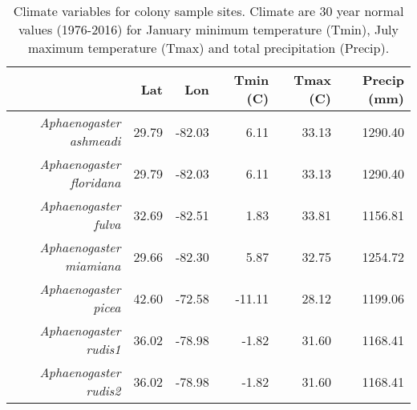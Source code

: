 \begin{table}[ht]
\centering
\begin{tabular}{rrrrrr}
  \hline
 & Lat & Lon & Tmin (C) & Tmax (C) & Precip (mm) \\ 
  \hline
{\emph{Aphaenogaster ashmeadi}} & 29.79 & -82.03 & 6.11 & 33.13 & 1290.40 \\ 
  {\emph{Aphaenogaster floridana}} & 29.79 & -82.03 & 6.11 & 33.13 & 1290.40 \\ 
  {\emph{Aphaenogaster fulva}} & 32.69 & -82.51 & 1.83 & 33.81 & 1156.81 \\ 
  {\emph{Aphaenogaster miamiana}} & 29.66 & -82.30 & 5.87 & 32.75 & 1254.72 \\ 
  {\emph{Aphaenogaster picea}} & 42.60 & -72.58 & -11.11 & 28.12 & 1199.06 \\ 
  {\emph{Aphaenogaster rudis1}} & 36.02 & -78.98 & -1.82 & 31.60 & 1168.41 \\ 
  {\emph{Aphaenogaster rudis2}} & 36.02 & -78.98 & -1.82 & 31.60 & 1168.41 \\ 
   \hline
\end{tabular}
\caption{Climate variables for colony sample sites. Climate are 30 year normal values (1976-2016) for January minimum temperature (Tmin), July maximum temperature (Tmax) and total precipitation (Precip).} 
\label{tab:climate}
\end{table}
